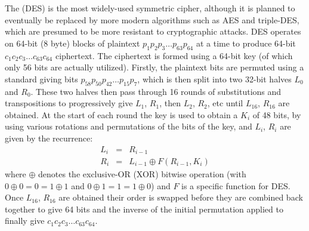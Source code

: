 The  (DES) is the most widely-used symmetric cipher,
although it is planned to eventually be replaced by more modern algorithms
such as AES and triple-DES, which are presumed to be more resistant to cryptographic attacks.
DES operates on 64-bit (8 byte) blocks of plaintext $p_1p_2p_3\dots p_{63}p_{64}$ at a time
to produce 64-bit $c_1c_2c_3\dots c_{63}c_{64}$ ciphertext.
The ciphertext is formed using a 64-bit key (of which only 56 bits are actually utilized).
Firstly, the plaintext bits are permuted using a standard 
giving bits $p_{58}p_{50}p_{42}\dots p_{15}p_7$, which is then split into two
32-bit halves $L_0$ and $R_0$.
These two halves then pass through 16 rounds of substitutions and transpositions
to progressively give $L_1$, $R_1$, then $L_2$, $R_2$, etc until $L_{16}$, $R_{16}$ are obtained.
At the start of each round the key is used to obtain a  $K_i$ of 48 bits,
by using various rotations and permutations of the bits of the key, and $L_i$, $R_i$
are given by the recurrence:
\begin{eqnarray*}
  L_i &=& R_{i-1} \\
  R_i &=& L_{i-1}\oplus F\left(R_{i-1},K_i\right)
\end{eqnarray*}
where $\oplus$ denotes the exclusive-OR (XOR) bitwise operation
(with $0\oplus0=0=1\oplus1$ and $0\oplus1=1=1\oplus0$) and
$F$ is a specific function for DES.
Once $L_{16}$, $R_{16}$ are obtained their order is swapped before they are
combined back together to give 64 bits and the inverse
of the initial permutation applied to finally give $c_1c_2c_3\dots c_{63}c_{64}$.

